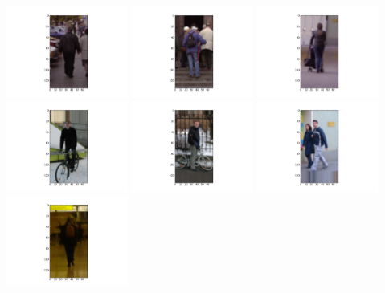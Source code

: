 \includegraphics[width=4cm]{dbshow-0-0.png} 
\includegraphics[width=4cm]{dbshow-0-1.png} 
\includegraphics[width=4cm]{dbshow-0-2.png} 
\includegraphics[width=4cm]{dbshow-0-3.png} 
\includegraphics[width=4cm]{dbshow-0-4.png} 
\includegraphics[width=4cm]{dbshow-0-5.png} 
\includegraphics[width=4cm]{dbshow-0-6.png} 
